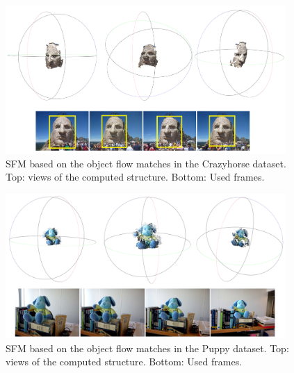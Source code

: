    \begin{figure}[t]
      \centering
      \includegraphics[width=0.95\textwidth]{../images/SFM.png}
      \caption{ SFM based on the object flow matches in the Crazyhorse dataset. Top: views of the computed structure. Bottom: Used frames. }
      \label{sfm1}
   \end{figure}

   \begin{figure}[t]
      \centering
      \includegraphics[width=0.95\textwidth]{../images/SFM2.png}
      \caption{ SFM based on the object flow matches in the Puppy dataset. Top: views of the computed structure. Bottom: Used frames. }
      \label{sfm1}
   \end{figure}